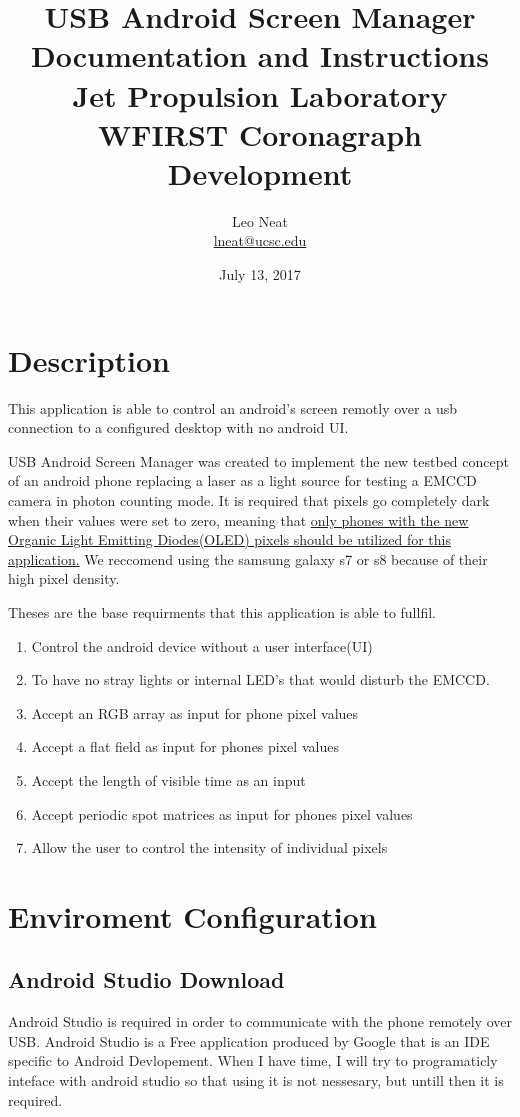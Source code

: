 \documentclass{article}
\title{%
	USB Android Screen Manager Documentation and Instructions \\
	\large Jet Propulsion Laboratory \\ 
	WFIRST Coronagraph Development}
\author{Leo Neat \\ \href{mailto:lneat@ucsc.edu}{lneat@ucsc.edu} }
\date{July 13, 2017}
\begin{document}
\maketitle


\section*{Description}
This application is able to control an android's screen remotly over a usb connection to a configured desktop with no android UI.  
\par USB Android Screen Manager was created to implement the new testbed concept of an android phone replacing a laser as a light source for testing a EMCCD camera in photon counting mode. It is required that pixels go completely dark when their values were set to zero, meaning that \ul{only phones with the new Organic Light Emitting Diodes(OLED) pixels should be utilized for this application.} We reccomend using the samsung galaxy s7 or s8 because of their high pixel density.  \par \medskip
Theses are the base requirments that this application is able to fullfil.
\begin{enumerate}
	\item Control the android device without a user interface(UI) 
	\item To have no stray lights or internal LED’s that would disturb the EMCCD. 
	\item Accept an RGB array as input for phone pixel values
	\item Accept a flat field as input for phones pixel values
	\item Accept the length of visible time as an input
	\item Accept periodic spot matrices as input for phones pixel values
	\item Allow the user to control the intensity of individual pixels
\end{enumerate}


\section{Enviroment Configuration}

\subsection{Android Studio Download}
	Android Studio is required in order to communicate with the phone remotely over USB. Android Studio is a Free application produced by Google that is an IDE specific to Android Devlopement. When I have time, I will try to programaticly 
inteface with android studio so that using it is not nessesary, but untill then it is required. \medskip
\end{document}
